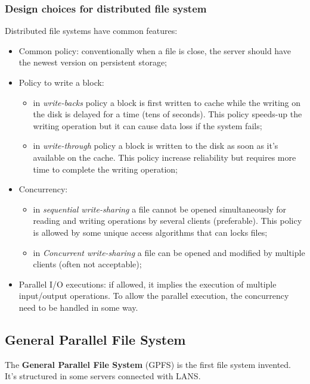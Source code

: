 \subsubsection{Design choices for distributed file system}
Distributed file systems have common features:
\begin{itemize}
    \item Common policy: conventionally when a file is close, the server should have the newest version on persistent storage;
    \item Policy to write a block:
    \begin{itemize}
        \item in \textit{write-backs} policy a block is first written to cache while the writing on the disk is delayed for a time (tens of seconds). This policy speeds-up the writing operation but it can cause data loss if the system fails;
        \item in \textit{write-through} policy a block is written to the disk as soon as it's available on the cache. This policy increase reliability but requires more time to complete the writing operation;
    \end{itemize}
    \item Concurrency:
    \begin{itemize}
        \item in \textit{sequential write-sharing} a file cannot be opened simultaneously for reading and writing operations by several clients (preferable). This policy is allowed by some unique access algorithms that can locks files;
        \item in \textit{Concurrent write-sharing} a file can be opened and modified by multiple clients (often not acceptable);
    \end{itemize}
    \item Parallel I/O executions: if allowed, it implies the execution of multiple input/output operations. To allow the parallel execution, the concurrency need to be handled in some way.
\end{itemize}


\subsection{General Parallel File System}
The \textbf{General Parallel File System} (GPFS) is the first file system invented. It's structured in some servers connected with LANS.

